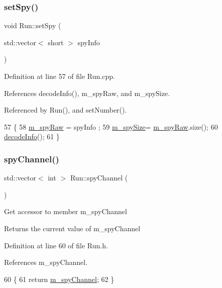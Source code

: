 \subsubsection{\texorpdfstring{set\+Spy()}{setSpy()}}
{\footnotesize\ttfamily void Run\+::set\+Spy (\begin{DoxyParamCaption}\item[{std\+::vector$<$ short $>$}]{spy\+Info }\end{DoxyParamCaption})}



Definition at line 57 of file Run.\+cpp.



References decode\+Info(), m\+\_\+spy\+Raw, and m\+\_\+spy\+Size.



Referenced by Run(), and set\+Number().


\begin{DoxyCode}
57                                              \{
58   \hyperlink{classRun_a825ab81f2a93f291878235dc13536688}{m\_spyRaw} = spyInfo ;
59   \hyperlink{classRun_a343bd5a0475c262da9b366933cf3a523}{m\_spySize}= \hyperlink{classRun_a825ab81f2a93f291878235dc13536688}{m\_spyRaw}.size();
60   \hyperlink{classRun_a2b2687a21cbe4b0b528bdb802a0ee585}{decodeInfo}();
61 \}
\end{DoxyCode}
\mbox{\label{classRun_a9ab05b137c79436688d59fba008f8078}} 
\subsubsection{\texorpdfstring{spy\+Channel()}{spyChannel()}}
{\footnotesize\ttfamily std\+::vector$<$ int $>$ Run\+::spy\+Channel (\begin{DoxyParamCaption}{ }\end{DoxyParamCaption})\hspace{0.3cm}{\ttfamily [inline]}}

Get accessor to member m\+\_\+spy\+Channel \begin{DoxyReturn}{Returns}
the current value of m\+\_\+spy\+Channel 
\end{DoxyReturn}


Definition at line 60 of file Run.\+h.



References m\+\_\+spy\+Channel.


\begin{DoxyCode}
60                                  \{
61     \textcolor{keywordflow}{return} \hyperlink{classRun_abe97602a3597cc941906069386a8d9aa}{m\_spyChannel};
62   \}
\end{DoxyCode}
\mbox{\label{classRun_a01c526576b5b821696229b53f6afd624}} 

